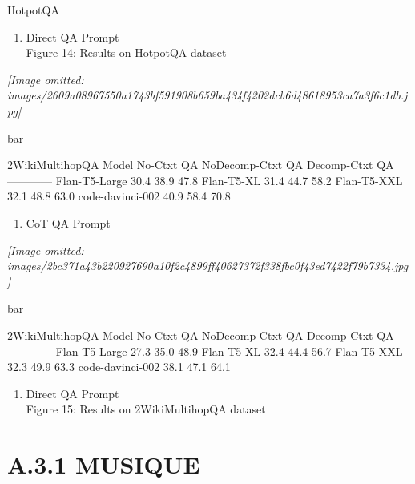 \documentclass[
]{article}
\providecommand{\tightlist}{%
  \setlength{\itemsep}{0pt}\setlength{\parskip}{0pt}}
\begin{document}
HotpotQA

\begin{enumerate}
\def\labelenumi{(\alph{enumi})}
\setcounter{enumi}{1}
\tightlist
\item
  Direct QA Prompt\\
  Figure 14: Results on HotpotQA dataset
\end{enumerate}

\textit{[Image omitted: images/2609a08967550a1743bf591908b659ba434f4202dcb6d48618953ca7a3f6c1db.jpg]}

bar

2WikiMultihopQA \textbar{} Model \textbar{} No-Ctxt QA \textbar{}
NoDecomp-Ctxt QA \textbar{} Decomp-Ctxt QA \textbar{}
\textbar---\textbar---\textbar---\textbar---\textbar{} \textbar{}
Flan-T5-Large \textbar{} 30.4 \textbar{} 38.9 \textbar{} 47.8 \textbar{}
\textbar{} Flan-T5-XL \textbar{} 31.4 \textbar{} 44.7 \textbar{} 58.2
\textbar{} \textbar{} Flan-T5-XXL \textbar{} 32.1 \textbar{} 48.8
\textbar{} 63.0 \textbar{} \textbar{} code-davinci-002 \textbar{} 40.9
\textbar{} 58.4 \textbar{} 70.8 \textbar{}

\begin{enumerate}
\def\labelenumi{(\alph{enumi})}
\tightlist
\item
  CoT QA Prompt
\end{enumerate}

\textit{[Image omitted: images/2bc371a43b220927690a10f2c4899ff40627372f338fbc0f43ed7422f79b7334.jpg]}

bar

2WikiMultihopQA \textbar{} Model \textbar{} No-Ctxt QA \textbar{}
NoDecomp-Ctxt QA \textbar{} Decomp-Ctxt QA \textbar{}
\textbar---\textbar---\textbar---\textbar---\textbar{} \textbar{}
Flan-T5-Large \textbar{} 27.3 \textbar{} 35.0 \textbar{} 48.9 \textbar{}
\textbar{} Flan-T5-XL \textbar{} 32.4 \textbar{} 44.4 \textbar{} 56.7
\textbar{} \textbar{} Flan-T5-XXL \textbar{} 32.3 \textbar{} 49.9
\textbar{} 63.3 \textbar{} \textbar{} code-davinci-002 \textbar{} 38.1
\textbar{} 47.1 \textbar{} 64.1 \textbar{}

\begin{enumerate}
\def\labelenumi{(\alph{enumi})}
\setcounter{enumi}{1}
\tightlist
\item
  Direct QA Prompt\\
  Figure 15: Results on 2WikiMultihopQA dataset
\end{enumerate}

\section{A.3.1 MUSIQUE}\label{a.3.1-musique}
\end{document}
